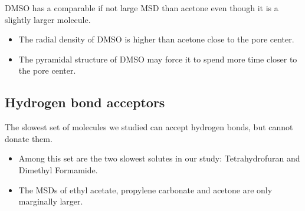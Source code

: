 \documentclass{article}
\begin{document}
  \noindent DMSO has a comparable if not large MSD than acetone even though it
  is a slightly larger molecule.
  \begin{itemize}
    \item The radial density of DMSO is higher than acetone close to the pore center.
  	\item The pyramidal structure of DMSO may force it to spend more time closer to
  	the pore center.
  \end{itemize}  
  
  \subsection*{Hydrogen bond acceptors}  %

  The slowest set of molecules we studied can accept hydrogen bonds, but cannot donate
  them. 
  \begin{itemize}
  	\item Among this set are the two slowest solutes in our study: Tetrahydrofuran and Dimethyl Formamide.
  	\item The MSDs of ethyl acetate, propylene carbonate and acetone are only marginally larger.
  \end{itemize}  
  
  
\end{document}
